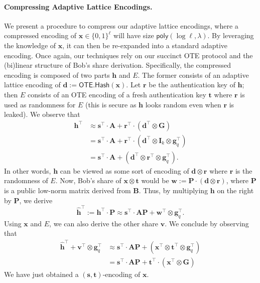 \documentclass{theoretics}
\newcommand{\OTE}{\mathsf{OTE}}
\newcommand{\poly}{\mathsf{poly}}
\renewcommand{\sec}{\ensuremath{\lambda}}
\newcommand{\algofont}[1]{\ensuremath{\mathsf{#1}}}
\newcommand{\Hash}{{\algofont{Hash}}}
\newcommand{\id}{\ensuremath{\mathbf{I}}}
\begin{document}
\paragraph{Compressing Adaptive Lattice Encodings.} We present a procedure to compress our adaptive lattice encodings, where a compressed encoding of $\mathbf{x}\in\{0, 1\}^\ell$ will have size $\poly(\log \ell, \sec)$. By leveraging the knowledge of $\mathbf{x}$, it can then be re-expanded into a standard adaptive encoding. Once again, our techniques rely on our succinct OTE protocol and the (bi)linear structure of Bob's share derivation. Specifically, the compressed encoding is composed of two parts $\mathbf{h}$ and $E$. The former consists of an adaptive lattice encoding of $\mathbf{d}:=\OTE.\Hash(\mathbf{x})$. Let $\mathbf{r}$ be the authentication key of $\mathbf{h}$; then $E$ consists of an OTE encoding of a fresh authentication key $\mathbf{t}$ where $\mathbf{r}$ is used as randomness for $E$ (this is secure as $\mathbf{h}$ looks random even when $\mathbf{r}$ is leaked). We observe that
\begin{align*}
    \mathbf{h}^\intercal&\approx\mathbf{s}^\intercal \cdot \mathbf{A}+\mathbf{r}^\intercal \cdot (\mathbf{d}^\intercal\otimes \mathbf{G})\\
    &=\mathbf{s}^\intercal \cdot \mathbf{A}+\mathbf{r}^\intercal \cdot (\mathbf{d}^\intercal\otimes \id_k\otimes \mathbf{g}_q^\intercal)\\
    &=\mathbf{s}^\intercal \cdot \mathbf{A}+(\mathbf{d}^\intercal\otimes \mathbf{r}^\intercal \otimes \mathbf{g}_q^\intercal).
\end{align*}
In other words, $\mathbf{h}$ can be viewed as some sort of encoding of $\mathbf{d}\otimes \mathbf{r}$ where $\mathbf{r}$ is the randomness of $E$. Now, Bob's share of $\mathbf{x}\otimes \mathbf{t}$ would be $\mathbf{w}:=\mathbf{P}\cdot (\mathbf{d}\otimes \mathbf{r})$, where $\mathbf{P}$ is a public low-norm matrix derived from $\mathbf{B}$. Thus, by multiplying $\mathbf{h}$ on the right by $\mathbf{P}$, we derive
\[\hat{\mathbf{h}}^\intercal:=\mathbf{h}^\intercal\cdot \mathbf{P}\approx \mathbf{s}^\intercal \cdot \mathbf{A} \mathbf{P}+\mathbf{w}^\intercal\otimes \mathbf{g}_q^\intercal.\]
 Using $\mathbf{x}$ and $E$, we can also derive the other share $\mathbf{v}$. We conclude by observing that
\begin{align*}
    \hat{\mathbf{h}}^\intercal+\mathbf{v}^\intercal\otimes \mathbf{g}_q^\intercal&\approx \mathbf{s}^\intercal \cdot \mathbf{A} \mathbf{P}+ (\mathbf{x}^\intercal\otimes \mathbf{t}^\intercal \otimes \mathbf{g}_q^\intercal)\\
    &=\mathbf{s}^\intercal \cdot \mathbf{A} \mathbf{P}+ \mathbf{t}^\intercal\cdot (\mathbf{x}^\intercal\otimes \mathbf{G})
\end{align*}
We have just obtained a $(\mathbf{s}, \mathbf{t})$-encoding of $\mathbf{x}$.
\end{document}
